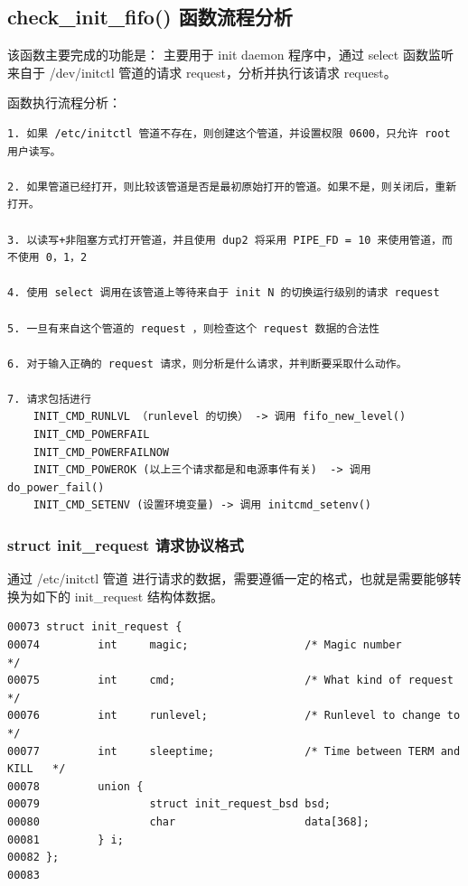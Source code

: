 \subsection{check\_init\_fifo() 函数流程分析}

该函数主要完成的功能是： 主要用于 init daemon 程序中，通过 select
函数监听来自于 /dev/initctl 管道的请求 request，分析并执行该请求
request。

函数执行流程分析：

{\begin{shaded}\begin{verbatim}
1. 如果 /etc/initctl 管道不存在，则创建这个管道，并设置权限 0600，只允许 root 用户读写。

2. 如果管道已经打开，则比较该管道是否是最初原始打开的管道。如果不是，则关闭后，重新打开。

3. 以读写+非阻塞方式打开管道，并且使用 dup2 将采用 PIPE_FD = 10 来使用管道，而不使用 0，1，2

4. 使用 select 调用在该管道上等待来自于 init N 的切换运行级别的请求 request

5. 一旦有来自这个管道的 request ，则检查这个 request 数据的合法性

6. 对于输入正确的 request 请求，则分析是什么请求，并判断要采取什么动作。

7. 请求包括进行 
    INIT_CMD_RUNLVL （runlevel 的切换） -> 调用 fifo_new_level()
    INIT_CMD_POWERFAIL
    INIT_CMD_POWERFAILNOW
    INIT_CMD_POWEROK (以上三个请求都是和电源事件有关)  -> 调用 do_power_fail()
    INIT_CMD_SETENV (设置环境变量) -> 调用 initcmd_setenv()
\end{verbatim}\end{shaded}}
\subsubsection{struct init\_request 请求协议格式}

通过 /etc/initctl 管道
进行请求的数据，需要遵循一定的格式，也就是需要能够转换为如下的
init\_request 结构体数据。

{\begin{shaded}\begin{verbatim}
00073 struct init_request {
00074         int     magic;                  /* Magic number                 */
00075         int     cmd;                    /* What kind of request         */
00076         int     runlevel;               /* Runlevel to change to        */
00077         int     sleeptime;              /* Time between TERM and KILL   */
00078         union {
00079                 struct init_request_bsd bsd;
00080                 char                    data[368];
00081         } i;
00082 };
00083 
\end{verbatim}\end{shaded}}
